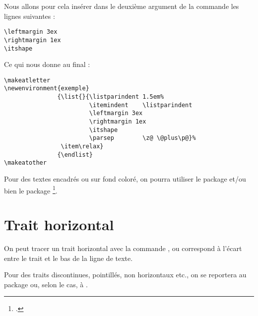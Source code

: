 Nous allons pour cela insérer dans le deuxième argument de la commande  les lignes suivantes :
\begin{verbatim}
\leftmargin 3ex
\rightmargin 1ex
\itshape
\end{verbatim}

Ce qui nous donne au final :

\begin{verbatim}
\makeatletter
\newenvironment{exemple}
               {\list{}{\listparindent 1.5em%
                        \itemindent    \listparindent
                        \leftmargin 3ex
		    			\rightmargin 1ex
		     			\itshape
                        \parsep        \z@ \@plus\p@}%
                \item\relax}
               {\endlist}
\makeatother
\end{verbatim}

\begin{anedocte}
Pour des textes encadrés ou sur fond coloré, on pourra utiliser le package  et/ou bien le package \footcites[On peut également consulter][qui regorge d'exemple pratique de \enquote{mise en boîte}]{frama}[on consultera en particulier][]{frama_boites}. 
\end{anedocte}

\section{Trait horizontal}

On peut tracer un trait horizontal avec la commande , ou  correspond à l'écart entre le trait et le bas de la ligne de texte.

Pour des traits discontinues, pointillés, non horizontaux etc., on se reportera au package  ou, selon le cas, à . 

